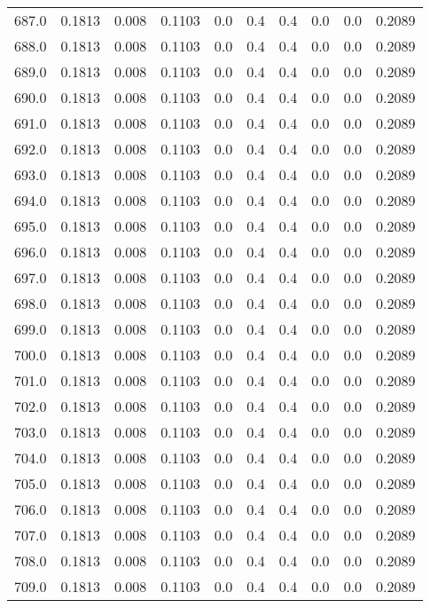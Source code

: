 \begin{longtable}{lrrrrrrrrr}
687.0 & 0.1813 & 0.008 & 0.1103 & 0.0 & 0.4 & 0.4 & 0.0 & 0.0 & 0.2089 \\
688.0 & 0.1813 & 0.008 & 0.1103 & 0.0 & 0.4 & 0.4 & 0.0 & 0.0 & 0.2089 \\
689.0 & 0.1813 & 0.008 & 0.1103 & 0.0 & 0.4 & 0.4 & 0.0 & 0.0 & 0.2089 \\
690.0 & 0.1813 & 0.008 & 0.1103 & 0.0 & 0.4 & 0.4 & 0.0 & 0.0 & 0.2089 \\
691.0 & 0.1813 & 0.008 & 0.1103 & 0.0 & 0.4 & 0.4 & 0.0 & 0.0 & 0.2089 \\
692.0 & 0.1813 & 0.008 & 0.1103 & 0.0 & 0.4 & 0.4 & 0.0 & 0.0 & 0.2089 \\
693.0 & 0.1813 & 0.008 & 0.1103 & 0.0 & 0.4 & 0.4 & 0.0 & 0.0 & 0.2089 \\
694.0 & 0.1813 & 0.008 & 0.1103 & 0.0 & 0.4 & 0.4 & 0.0 & 0.0 & 0.2089 \\
695.0 & 0.1813 & 0.008 & 0.1103 & 0.0 & 0.4 & 0.4 & 0.0 & 0.0 & 0.2089 \\
696.0 & 0.1813 & 0.008 & 0.1103 & 0.0 & 0.4 & 0.4 & 0.0 & 0.0 & 0.2089 \\
697.0 & 0.1813 & 0.008 & 0.1103 & 0.0 & 0.4 & 0.4 & 0.0 & 0.0 & 0.2089 \\
698.0 & 0.1813 & 0.008 & 0.1103 & 0.0 & 0.4 & 0.4 & 0.0 & 0.0 & 0.2089 \\
699.0 & 0.1813 & 0.008 & 0.1103 & 0.0 & 0.4 & 0.4 & 0.0 & 0.0 & 0.2089 \\
700.0 & 0.1813 & 0.008 & 0.1103 & 0.0 & 0.4 & 0.4 & 0.0 & 0.0 & 0.2089 \\
701.0 & 0.1813 & 0.008 & 0.1103 & 0.0 & 0.4 & 0.4 & 0.0 & 0.0 & 0.2089 \\
702.0 & 0.1813 & 0.008 & 0.1103 & 0.0 & 0.4 & 0.4 & 0.0 & 0.0 & 0.2089 \\
703.0 & 0.1813 & 0.008 & 0.1103 & 0.0 & 0.4 & 0.4 & 0.0 & 0.0 & 0.2089 \\
704.0 & 0.1813 & 0.008 & 0.1103 & 0.0 & 0.4 & 0.4 & 0.0 & 0.0 & 0.2089 \\
705.0 & 0.1813 & 0.008 & 0.1103 & 0.0 & 0.4 & 0.4 & 0.0 & 0.0 & 0.2089 \\
706.0 & 0.1813 & 0.008 & 0.1103 & 0.0 & 0.4 & 0.4 & 0.0 & 0.0 & 0.2089 \\
707.0 & 0.1813 & 0.008 & 0.1103 & 0.0 & 0.4 & 0.4 & 0.0 & 0.0 & 0.2089 \\
708.0 & 0.1813 & 0.008 & 0.1103 & 0.0 & 0.4 & 0.4 & 0.0 & 0.0 & 0.2089 \\
709.0 & 0.1813 & 0.008 & 0.1103 & 0.0 & 0.4 & 0.4 & 0.0 & 0.0 & 0.2089 \\

\end{longtable}
